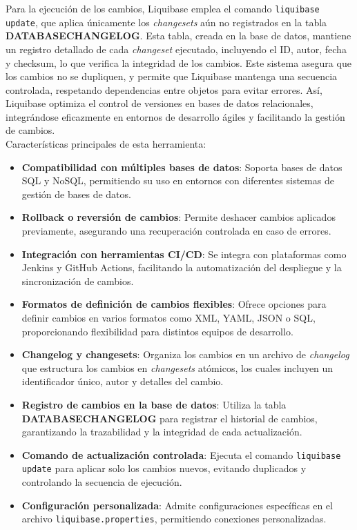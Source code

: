 \documentclass{IEEEtran}
\begin{document}
Para la ejecución de los cambios, Liquibase emplea el comando \texttt{liquibase update}, que aplica únicamente los \textit{changesets} aún no registrados en la tabla \textbf{DATABASECHANGELOG}. Esta tabla, creada en la base de datos, mantiene un registro detallado de cada \textit{changeset} ejecutado, incluyendo el ID, autor, fecha y checksum, lo que verifica la integridad de los cambios. Este sistema asegura que los cambios no se dupliquen, y permite que Liquibase mantenga una secuencia controlada, respetando dependencias entre objetos para evitar errores. Así, Liquibase optimiza el control de versiones en bases de datos relacionales, integrándose eficazmente en entornos de desarrollo ágiles y facilitando la gestión de cambios.\\


Características principales de esta herramienta:

\begin{itemize}
    \item \textbf{Compatibilidad con múltiples bases de datos}: Soporta bases de datos SQL y NoSQL, permitiendo su uso en entornos con diferentes sistemas de gestión de bases de datos.
    \item \textbf{Rollback o reversión de cambios}: Permite deshacer cambios aplicados previamente, asegurando una recuperación controlada en caso de errores.
    \item \textbf{Integración con herramientas CI/CD}: Se integra con plataformas como Jenkins y GitHub Actions, facilitando la automatización del despliegue y la sincronización de cambios.
    \item \textbf{Formatos de definición de cambios flexibles}: Ofrece opciones para definir cambios en varios formatos como XML, YAML, JSON o SQL, proporcionando flexibilidad para distintos equipos de desarrollo.
    \item \textbf{Changelog y changesets}: Organiza los cambios en un archivo de \textit{changelog} que estructura los cambios en \textit{changesets} atómicos, los cuales incluyen un identificador único, autor y detalles del cambio.
    \item \textbf{Registro de cambios en la base de datos}: Utiliza la tabla \textbf{DATABASECHANGELOG} para registrar el historial de cambios, garantizando la trazabilidad y la integridad de cada actualización.
    \item \textbf{Comando de actualización controlada}: Ejecuta el comando \texttt{liquibase update} para aplicar solo los cambios nuevos, evitando duplicados y controlando la secuencia de ejecución.
    \item \textbf{Configuración personalizada}: Admite configuraciones específicas en el archivo \texttt{liquibase.properties}, permitiendo conexiones personalizadas.
\end{itemize}
\end{document}
